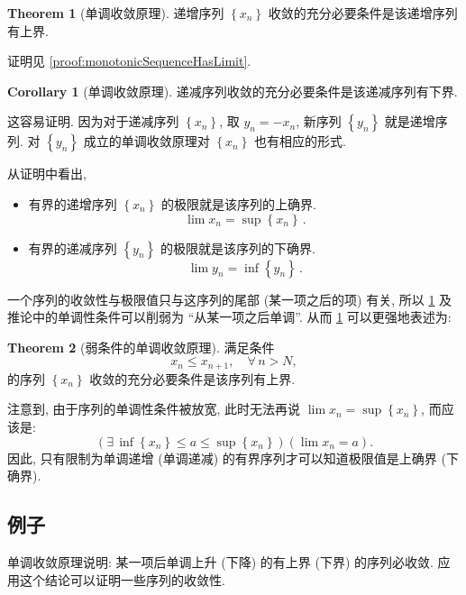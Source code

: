\documentclass{book}
\newcommand{\Exists}{\exists\,}
\newcommand{\Any}{\forall\,}
\newcommand{\set}[1]{\left\{#1\right\}}
\renewcommand{\le}{\leqslant}
\numberwithin{equation}{section}
\numberwithin{figure}{section}
\theoremstyle{definition}
\newtheorem{theorem}{Theorem}[section]
\newtheorem{corollary}{Corollary}[section]
\newcommand{\dq}[1]{``#1''}
\begin{document}
\begin{theorem}[单调收敛原理]
  递增序列 $\set{x_n}$ 收敛的充分必要条件是该递增序列有上界.
  \label{the:monotonicSequenceHasLimit}
\end{theorem}
证明见 \cref{proof:monotonicSequenceHasLimit}.

\begin{corollary}[单调收敛原理]
  递减序列收敛的充分必要条件是该递减序列有下界.
\end{corollary}
这容易证明. 因为对于递减序列 $\set{x_n}$, 取 $y_n=-x_n$, 新序列 $\set{y_n}$ 就是递增序列. 对 $\set{y_n}$ 成立的单调收敛原理对 $\set{x_n}$ 也有相应的形式.

从证明中看出,
\begin{itemize}
  \item 有界的递增序列 $\set{x_n}$ 的极限就是该序列的上确界.
    \begin{equation*}
      \lim x_n=\sup\set{x_n}\,.
    \end{equation*}
  \item 有界的递减序列 $\set{y_n}$ 的极限就是该序列的下确界.
    \begin{equation*}
      \lim y_n=\inf\set{y_n}\,.
    \end{equation*}
\end{itemize}

一个序列的收敛性与极限值只与这序列的尾部 (某一项之后的项) 有关, 所以 \cref{the:monotonicSequenceHasLimit} 及推论中的单调性条件可以削弱为 \dq{从某一项之后单调}. 从而 \cref{the:monotonicSequenceHasLimit} 可以更强地表述为:
\begin{theorem}[弱条件的单调收敛原理]
  满足条件
  \begin{equation*}
    x_n\le x_{n+1},\quad\Any n>N,
  \end{equation*}
  的序列 $\set{x_n}$ 收敛的充分必要条件是该序列有上界.
\end{theorem}

注意到, 由于序列的单调性条件被放宽, 此时无法再说 $\lim x_n=\sup\set{x_n}$, 而应该是:
\begin{equation*}
  (\Exists \inf\set{x_n}\le a\le \sup\set{x_n})(\lim x_n=a).
\end{equation*}
因此, 只有限制为单调递增 (单调递减) 的有界序列才可以知道极限值是上确界 (下确界).

\subsection{例子}
单调收敛原理说明: 某一项后单调上升 (下降) 的有上界 (下界) 的序列必收敛. 应用这个结论可以证明一些序列的收敛性.
\end{document}
